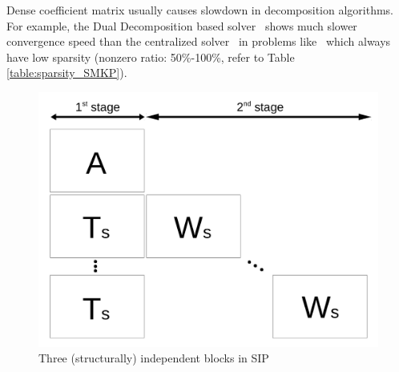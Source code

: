 Dense coefficient matrix usually causes slowdown in decomposition algorithms. For example, the Dual Decomposition based solver \dsp\ shows much slower convergence speed than the centralized solver \cplex\ in problems like \smkp\ which always have low sparsity (nonzero ratio: 50\%-100\%, refer to Table \ref{table:sparsity_SMKP}).
\begin{figure}
	\centering
	\includegraphics[width=0.7\linewidth]{drawings/stagewise_sparsity}
	\caption{Three (structurally) independent blocks in SIP}
	\label{fig:stagewise_sparsity}
\end{figure}









